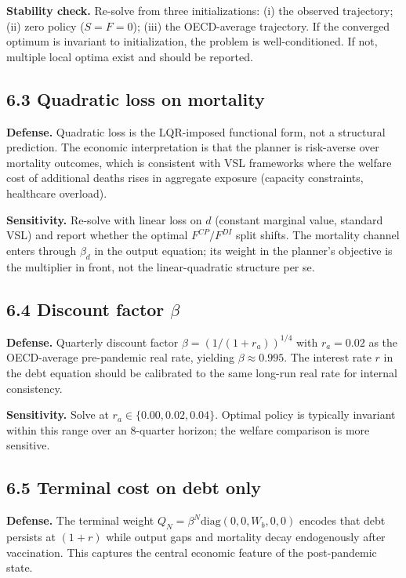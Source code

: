 \documentclass[11pt,a4paper]{article}
\begin{document}
\textbf{Stability check.} Re-solve from three initializations: (i) the observed trajectory; (ii) zero policy ($S = F = 0$); (iii) the OECD-average trajectory. If the converged optimum is invariant to initialization, the problem is well-conditioned. If not, multiple local optima exist and should be reported.

\subsection*{6.3 Quadratic loss on mortality}

\textbf{Defense.} Quadratic loss is the LQR-imposed functional form, not a structural prediction. The economic interpretation is that the planner is risk-averse over mortality outcomes, which is consistent with VSL frameworks where the welfare cost of additional deaths rises in aggregate exposure (capacity constraints, healthcare overload).

\textbf{Sensitivity.} Re-solve with linear loss on $d$ (constant marginal value, standard VSL) and report whether the optimal $F^{CP}/F^{DI}$ split shifts. The mortality channel enters through $\beta_d$ in the output equation; its weight in the planner's objective is the multiplier in front, not the linear-quadratic structure per se.

\subsection*{6.4 Discount factor $\beta$}

\textbf{Defense.} Quarterly discount factor $\beta = (1/(1+r_a))^{1/4}$ with $r_a = 0.02$ as the OECD-average pre-pandemic real rate, yielding $\beta \approx 0.995$. The interest rate $r$ in the debt equation should be calibrated to the same long-run real rate for internal consistency.

\textbf{Sensitivity.} Solve at $r_a \in \{0.00, 0.02, 0.04\}$. Optimal policy is typically invariant within this range over an 8-quarter horizon; the welfare comparison is more sensitive.

\subsection*{6.5 Terminal cost on debt only}

\textbf{Defense.} The terminal weight $Q_N = \beta^N \text{diag}(0, 0, W_b, 0, 0)$ encodes that debt persists at $(1+r)$ while output gaps and mortality decay endogenously after vaccination. This captures the central economic feature of the post-pandemic state.
\end{document}
